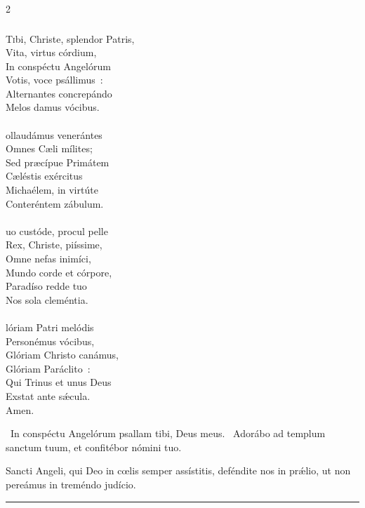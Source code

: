 \documentclass[9pt,twoside]{extarticle}
\begin{document}
\begin{multicols}{2}
{{{\subsubsection*{\center {}}
\lettrine{T}ibi, Christe, splendor Patris,\\
Vita, virtus córdium,\\
In conspéctu Angelórum\\
Votis, voce psállimus~:\\
Alternantes concrepándo\\
Melos damus vócibus.\\
\\
ollaudámus venerántes\\
Omnes Cæli mílites;\\
Sed præcípue Primátem\\
Cæléstis exércitus\\
Michaélem, in virtúte\\
Conteréntem zábulum.\\
\\
uo custóde, procul pelle\\
Rex, Christe, piíssime,\\
Omne nefas inimíci,\\
Mundo corde et córpore,\\
Paradíso redde tuo\\
Nos sola cleméntia.\\
\\
lóriam Patri melódis\\
Personémus vócibus,\\
Glóriam Christo canámus,\\
Glóriam Paráclito~:\\
Qui Trinus et unus Deus\\
Exstat ante sǽcula.\\
Amen.

\begin{tightlist}{}
\item {}~In conspéctu Angelórum psallam tibi, Deus meus. ~Adorábo ad templum sanctum tuum, et confitébor nómini tuo.
\item {} Sancti Angeli, qui Deo in cœlis semper assístitis, deféndite nos in prǽlio, ut non pereámus in treméndo judício.
\end{tightlist}

\begin{center}\textcolor{red}{\rule{\linewidth}{0.5pt}} \end{center}

}}}
\end{multicols}
\end{document}
